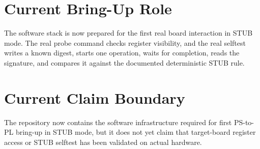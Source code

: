 \section{Current Bring-Up Role}
The software stack is now prepared for the first real board interaction in STUB mode. The real probe command checks register visibility, and the real selftest writes a known digest, starts one operation, waits for completion, reads the signature, and compares it against the documented deterministic STUB rule.

\section{Current Claim Boundary}
The repository now contains the software infrastructure required for first PS-to-PL bring-up in STUB mode, but it does not yet claim that target-board register access or STUB selftest has been validated on actual hardware.